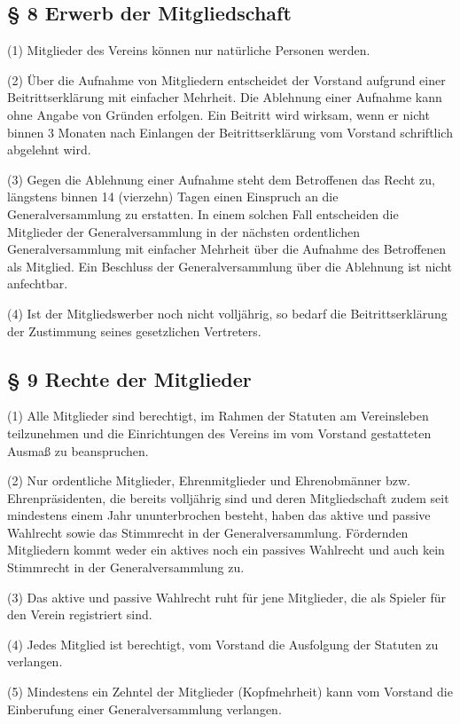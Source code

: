 \documentclass[11pt,a4paper]{article}
\begin{document}
\subsection{§ 8
Erwerb der Mitgliedschaft}

(1)
Mitglieder des Vereins können nur natürliche Personen werden.

(2)
Über die Aufnahme von Mitgliedern entscheidet der Vorstand aufgrund einer Beitrittserklärung mit einfacher Mehrheit.
Die Ablehnung einer Aufnahme kann ohne Angabe von Gründen erfolgen.
Ein Beitritt wird wirksam, wenn er nicht binnen 3 Monaten nach Einlangen der Beitrittserklärung vom Vorstand schriftlich abgelehnt wird.

(3)
Gegen die Ablehnung einer Aufnahme steht dem Betroffenen das Recht zu, längstens binnen 14 (vierzehn) Tagen einen Einspruch an die Generalversammlung zu erstatten.
In einem solchen Fall entscheiden die Mitglieder der Generalversammlung in der nächsten ordentlichen Generalversammlung mit einfacher Mehrheit über die Aufnahme des Betroffenen als Mitglied.
Ein Beschluss der Generalversammlung über die Ablehnung ist nicht anfechtbar.

(4)
Ist der Mitgliedswerber noch nicht volljährig, so bedarf die Beitrittserklärung der Zustimmung seines gesetzlichen Vertreters.

\subsection{§ 9
Rechte der Mitglieder}

(1)
Alle Mitglieder sind berechtigt, im Rahmen der Statuten am Vereinsleben teilzunehmen und die Einrichtungen des Vereins im vom Vorstand gestatteten Ausmaß zu beanspruchen.

(2)
Nur ordentliche Mitglieder, Ehrenmitglieder und Ehrenobmänner bzw.
Ehrenpräsidenten, die bereits volljährig sind und deren Mitgliedschaft zudem seit mindestens einem Jahr ununterbrochen besteht, haben das aktive und passive Wahlrecht sowie das Stimmrecht in der Generalversammlung.
Fördernden Mitgliedern kommt weder ein aktives noch ein passives Wahlrecht und auch kein Stimmrecht in der Generalversammlung zu.

(3)
Das aktive und passive Wahlrecht ruht für jene Mitglieder, die als Spieler für den Verein registriert sind.

(4)
Jedes Mitglied ist berechtigt, vom Vorstand die Ausfolgung der Statuten zu verlangen.

(5)
Mindestens ein Zehntel der Mitglieder (Kopfmehrheit) kann vom Vorstand die Einberufung einer Generalversammlung verlangen.
\end{document}

